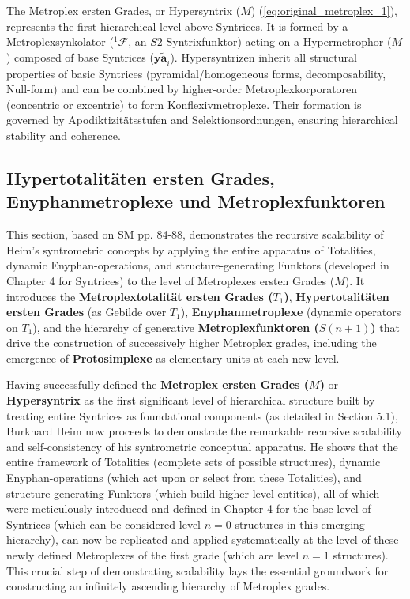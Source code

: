 \documentclass[12pt]{article}
\newcommand{\syntrix}{\bm{y\widetilde{a}}}
\def\metroplex#1#2{M}%
\newcommand{\hypersyntrix}{\metroplex{1}{F}}
\newcommand{\hypermetrophor}[1]{%
  \metroplex{#1}{a}%
}
\newcommand{\metroplexsynkolator}[1]{{}^{#1}\mathcal{F}}
\newcommand{\metroplextotalitaet}[1]{T_{#1}}
\newcommand{\metroplexfunktor}{S}
\begin{document}
The Metroplex ersten Grades, or Hypersyntrix (\(\hypersyntrix\)) (\eqref{eq:original_metroplex_1}), represents the first hierarchical level above Syntrices. It is formed by a Metroplexsynkolator (\(\metroplexsynkolator{1}\), an \(S2\) Syntrixfunktor) acting on a Hypermetrophor (\(\hypermetrophor{1}\)) composed of base Syntrices (\(\syntrix_i\)). Hypersyntrizen inherit all structural properties of basic Syntrices (pyramidal/homogeneous forms, decomposability, Null-form) and can be combined by higher-order Metroplexkorporatoren (concentric or excentric) to form Konflexivmetroplexe. Their formation is governed by Apodiktizitätsstufen and Selektionsordnungen, ensuring hierarchical stability and coherence.

\subsection{Hypertotalitäten ersten Grades, Enyphanmetroplexe und Metroplexfunktoren}
\label{sec:hypertotalitaeten}

This section, based on SM pp. 84-88, demonstrates the recursive scalability of Heim's syntrometric concepts by applying the entire apparatus of Totalities, dynamic Enyphan-operations, and structure-generating Funktors (developed in Chapter 4 for Syntrices) to the level of Metroplexes ersten Grades (\(\hypersyntrix\)). It introduces the \textbf{Metroplextotalität ersten Grades (\(\metroplextotalitaet{1}\))}, \textbf{Hypertotalitäten ersten Grades} (as Gebilde over \( \metroplextotalitaet{1} \)), \textbf{Enyphanmetroplexe} (dynamic operators on \( \metroplextotalitaet{1} \)), and the hierarchy of generative \textbf{Metroplexfunktoren (\(\metroplexfunktor(n+1)\))} that drive the construction of successively higher Metroplex grades, including the emergence of \textbf{Protosimplexe} as elementary units at each new level.

Having successfully defined the \textbf{Metroplex ersten Grades (\( \hypersyntrix \))} or \textbf{Hypersyntrix} as the first significant level of hierarchical structure built by treating entire Syntrices as foundational components (as detailed in Section 5.1), Burkhard Heim now proceeds to demonstrate the remarkable recursive scalability and self-consistency of his syntrometric conceptual apparatus. He shows that the entire framework of Totalities (complete sets of possible structures), dynamic Enyphan-operations (which act upon or select from these Totalities), and structure-generating Funktors (which build higher-level entities), all of which were meticulously introduced and defined in Chapter 4 for the base level of Syntrices (which can be considered level \( n=0 \) structures in this emerging hierarchy), can now be replicated and applied systematically at the level of these newly defined Metroplexes of the first grade (which are level \( n=1 \) structures). This crucial step of demonstrating scalability lays the essential groundwork for constructing an infinitely ascending hierarchy of Metroplex grades.
\end{document}
